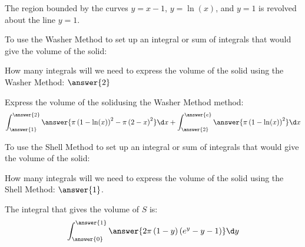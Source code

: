 \documentclass{ximera}
\author{ Jason Miller}
\begin{document}
\begin{exercise}

The region bounded by the curves $y=x-1$, $y=\ln(x)$, and $y=1$ is revolved about the line $y=1$. 

To use the Washer Method to set up an integral or sum of integrals that would give the volume of the solid: 

  \begin{multipleChoice}
  \end{multipleChoice}

How many integrals will we need to express the volume of the solid using the Washer Method: $\answer{2}$

\begin{exercise}

Express the volume of the solidusing the Washer Method method: 
\[
\int_{\answer{1}}^{\answer{2}} \answer{ \pi \left( 1 - \ln(x) \right)^{2} - \pi \left( 2-x \right)^{2} } \d x + \int_{\answer{2}}^{\answer{e}} \answer{ \pi \left( 1- \ln(x) \right)^{2} } \d x
\]
\end{exercise}
\end{exercise}

\begin{exercise}

To use the Shell Method to set up an integral or sum of integrals that would give the volume of the solid: 

  \begin{multipleChoice}
  \end{multipleChoice}

How many integrals will we need to express the volume of the solid using the Shell Method: $\answer{1}$. 


\begin{exercise} 
The integral that gives the volume of $S$ is: 
\[
\int_{\answer{0}}^{\answer{1}} \answer{ 2\pi \left( 1-y \right) \left( e^{y}-y-1 \right)} \d y
\] 


\end{exercise}
\end{exercise}
\end{document}
